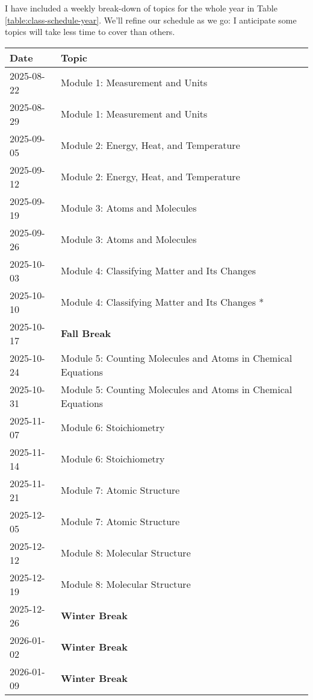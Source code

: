 \documentclass[11pt, oneside]{article}   	%
\begin{document}
I have included a weekly break-down of topics for the whole year in Table \ref{table:class-schedule-year}.
We'll refine our schedule as we go: I anticipate some topics will take less time to cover than others.

\begin{table}[h]
\centering
\begin{tabular}{ l | l }
Date & Topic \\
\hline
2025-08-22 & Module 1:  Measurement and Units \\
2025-08-29 & Module 1:  Measurement and Units \\
2025-09-05 & Module 2: Energy, Heat, and Temperature \\
2025-09-12 & Module 2: Energy, Heat, and Temperature \\
2025-09-19 & Module 3: Atoms and Molecules \\
2025-09-26 & Module 3: Atoms and Molecules \\
2025-10-03 & Module 4: Classifying Matter and Its Changes \\
2025-10-10 & Module 4: Classifying Matter and Its Changes * \\

2025-10-17 & \textbf{Fall Break} \\

2025-10-24 & Module 5: Counting Molecules and Atoms in Chemical Equations \\
2025-10-31 & Module 5: Counting Molecules and Atoms in Chemical Equations \\
2025-11-07 & Module 6: Stoichiometry \\
2025-11-14 & Module 6: Stoichiometry \\
2025-11-21 & Module 7: Atomic Structure \\
2025-12-05 & Module 7: Atomic Structure \\
2025-12-12 & Module 8: Molecular Structure \\
2025-12-19 & Module 8: Molecular Structure \\

2025-12-26  & \textbf{Winter Break} \\
2026-01-02  & \textbf{Winter Break} \\
2026-01-09  & \textbf{Winter Break} \\


\end{tabular}
\end{table}
\end{document}
